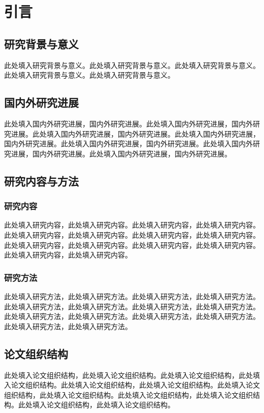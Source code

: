 \chapter{引言}

\section{研究背景与意义}
此处填入研究背景与意义。此处填入研究背景与意义。此处填入研究背景与意义。此处填入研究背景与意义。此处填入研究背景与意义。

\section{国内外研究进展}
此处填入国内外研究进展，国内外研究进展。此处填入国内外研究进展，国内外研究进展。此处填入国内外研究进展，国内外研究进展。此处填入国内外研究进展，国内外研究进展。此处填入国内外研究进展，国内外研究进展。此处填入国内外研究进展，国内外研究进展。此处填入国内外研究进展，国内外研究进展。

\section{研究内容与方法}
\subsection{研究内容}
此处填入研究内容，此处填入研究内容。此处填入研究内容，此处填入研究内容。此处填入研究内容，此处填入研究内容。此处填入研究内容，此处填入研究内容。此处填入研究内容，此处填入研究内容。此处填入研究内容，此处填入研究内容。此处填入研究内容，此处填入研究内容。

\subsection{研究方法}
此处填入研究方法，此处填入研究方法。此处填入研究方法，此处填入研究方法。此处填入研究方法，此处填入研究方法。此处填入研究方法，此处填入研究方法。此处填入研究方法，此处填入研究方法。此处填入研究方法，此处填入研究方法。此处填入研究方法，此处填入研究方法。

\section{论文组织结构}
此处填入论文组织结构，此处填入论文组织结构。此处填入论文组织结构，此处填入论文组织结构。此处填入论文组织结构，此处填入论文组织结构。此处填入论文组织结构，此处填入论文组织结构。此处填入论文组织结构，此处填入论文组织结构。此处填入论文组织结构，此处填入论文组织结构。

